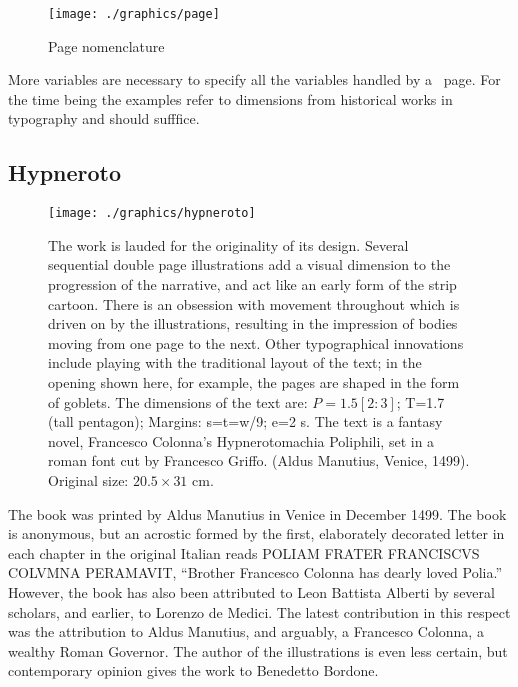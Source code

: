 \begin{figure}
  \texttt{[image: ./graphics/page]}
  \caption{Page nomenclature}
   \label{fig:marginfig1}
\end{figure}

More variables are necessary to specify all the variables handled by a \latex\
page. For the time being the examples refer to dimensions from historical works
in typography and should sufffice.

\subsection{Hypneroto}

\begin{figure}[htbp]
\centering
  \texttt{[image: ./graphics/hypneroto]}
\caption{The work is lauded for the originality of its
design. Several sequential double page
illustrations add a visual dimension to the
progression of the narrative, and act like an
early form of the strip cartoon. There is an
obsession with movement throughout which is driven
on by the illustrations, resulting in the
impression of bodies moving from one page to the
next. Other typographical innovations include
playing with the traditional layout of the text;
in the opening shown here, for example, the pages
are shaped in the form of goblets. The dimensions
of the text are: $P=1.5[2:3]$; T=1.7 (tall pentagon);
Margins: s=t=w/9; e=2 s. The text is a fantasy
novel, Francesco Colonna's Hypnerotomachia
Poliphili, set in a roman font cut by Francesco
Griffo. (Aldus Manutius, Venice, 1499). Original
size: $20.5 \times 31$ cm.}
\label{fig:hypneroto}
\end{figure}





The book was printed by Aldus Manutius in Venice in December 1499. The book is anonymous, but an acrostic formed by the first, elaborately decorated letter in each chapter in the original Italian reads \textsc{\small POLIAM FRATER FRANCISCVS COLVMNA PERAMAVIT}, \enquote{Brother Francesco Colonna has dearly loved Polia.} However, the book has also been attributed to Leon Battista Alberti by several scholars, and earlier, to Lorenzo de Medici. The latest contribution in this respect was the attribution to Aldus Manutius, and arguably, a Francesco Colonna, a wealthy Roman Governor. The author of the illustrations is even less certain, but contemporary opinion gives the work to Benedetto Bordone.




